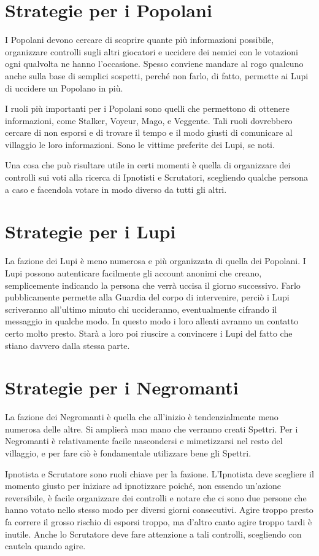 \documentclass[a4paper,10pt]{article}
\begin{document}
\section{Strategie per i Popolani}

I Popolani devono cercare di scoprire quante più informazioni possibile, organizzare controlli sugli altri giocatori e uccidere dei nemici con le votazioni ogni qualvolta ne hanno l'occasione. Spesso conviene mandare al rogo qualcuno anche sulla base di semplici sospetti, perché non farlo, di fatto, permette ai Lupi di uccidere un Popolano in più.

I ruoli più importanti per i Popolani sono quelli che permettono di ottenere informazioni, come Stalker, Voyeur, Mago, e Veggente. Tali ruoli dovrebbero cercare di non esporsi e di trovare il tempo e il modo giusti di comunicare al villaggio le loro informazioni. Sono le vittime preferite dei Lupi, se noti.

Una cosa che può risultare utile in certi momenti è quella di organizzare dei controlli sui voti alla ricerca di Ipnotisti e Scrutatori, scegliendo qualche persona a caso e facendola votare in modo diverso da tutti gli altri.

\section{Strategie per i Lupi}

La fazione dei Lupi è meno numerosa e più organizzata di quella dei Popolani.
I Lupi possono autenticare facilmente gli account anonimi che creano, semplicemente indicando la persona che verrà uccisa il giorno successivo. Farlo pubblicamente permette alla Guardia del corpo di intervenire, perciò i Lupi scriveranno all'ultimo minuto chi uccideranno, eventualmente cifrando il messaggio in qualche modo. In questo modo i loro alleati avranno un contatto certo molto presto. Starà a loro poi riuscire a convincere i Lupi del fatto che stiano davvero dalla stessa parte.

\section{Strategie per i Negromanti}

La fazione dei Negromanti è quella che all'inizio è tendenzialmente meno numerosa delle altre. Si amplierà man mano che verranno creati Spettri. Per i Negromanti è relativamente facile nascondersi e mimetizzarsi nel resto del villaggio, e per fare ciò è fondamentale utilizzare bene gli Spettri.

Ipnotista e Scrutatore sono ruoli chiave per la fazione. L'Ipnotista deve scegliere il momento giusto per iniziare ad ipnotizzare poiché, non essendo un'azione reversibile, è facile organizzare dei controlli e notare che ci sono due persone che hanno votato nello stesso modo per diversi giorni consecutivi. Agire troppo presto fa correre il grosso rischio di esporsi troppo, ma d'altro canto agire troppo tardi è inutile. Anche lo Scrutatore deve fare attenzione a tali controlli, scegliendo con cautela quando agire.
\end{document}
